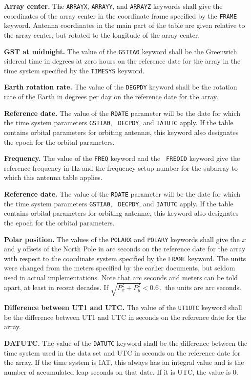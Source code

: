 \documentclass[twoside]{article}
\newcommand{\Me}[1]{\textcolor{mecol}{#1}}
\begin{document}
{\bf Array center.} The {\tt ARRAYX}, {\tt ARRAYY}, and {\tt ARRAYZ}
keywords shall give the coordinates of the array center in the
coordinate frame specified by the {\tt FRAME} keyword.  Antenna
coordinates in the main part of the table are given relative to the
array center\Me{, but rotated to the longitude of the array center.
\label{rev:AN1}}

{\bf GST at midnight.} The value of the {\tt GSTIA0} keyword shall be
the Greenwich sidereal time in degrees at zero hours on the reference
date for the array in the  time system specified by the {\tt TIMESYS}
keyword.

{\bf Earth rotation rate.} The value of the {\tt DEGPDY} keyword shall
be the rotation rate of the Earth in degrees per day on the reference
date for the array.

{\bf Reference date.} The value of the {\tt RDATE} parameter will be
the date for which the time system parameters {\tt GSTIA0}, {\tt
DECPDY}, and {\tt IATUTC} apply.  If the table contains orbital
parameters for orbiting antenn\ae, this keyword also designates the
epoch for the orbital parameters.

{\bf Frequency\@.} The value of the {\tt FREQ} keyword and the {\tt
  FREQID} keyword give the reference frequency in Hz and the frequency
setup number for the subarray to which this antenna table applies.

{\bf Reference date.} The value of the {\tt RDATE} parameter will be
the date for which the time system parameters {\tt GSTIA0}, {\tt
DECPDY}, and {\tt IATUTC} apply.  If the table contains orbital
parameters for orbiting antenn\ae, this keyword also designates the
epoch for the orbital parameters.

{\bf Polar position.} The values of the {\tt POLARX} and {\tt POLARY}
keywords shall give the $x$ and $y$ offsets of the North Pole in
arc seconds on the reference date for the array with respect to
the coordinate system specified by the {\tt FRAME} keyword.  The
units were changed from the meters specified by the earlier documents,
but seldom used in actual implementations.  Note that arc seconds and
meters can be told apart, at least in recent decades.  If $\sqrt{P_x^2
  + P_y^2} < 0.6\, ,$ the units are arc seconds.

{\bf Difference between UT1 and UTC\@.} The value of the {\tt UT1UTC}
keyword shall be the difference between UT1 and UTC in seconds on the
reference date for the array.

{\bf DATUTC\@.} The value of the {\tt DATUTC} keyword shall be the
difference between the time system used in the data set and UTC in
seconds on the reference date for the array.  If the time system is
IAT, this always has an integral value and is the number of
accumulated leap seconds on that date.  If it is UTC, the value is 0.
\end{document}
